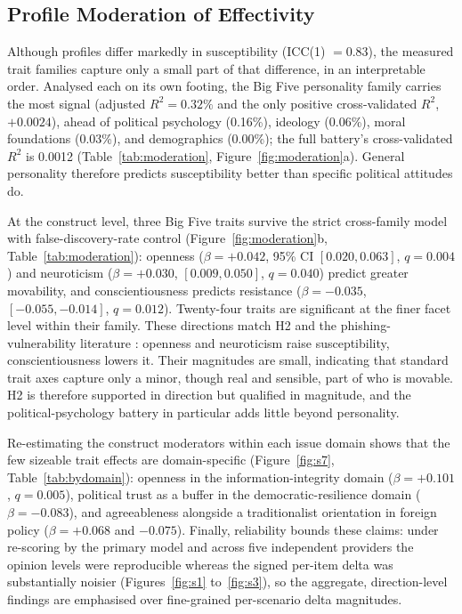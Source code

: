 \documentclass[11pt,a4paper]{article}
\begin{document}
\subsection{Profile Moderation of Effectivity}\label{sec:moderation}

Although profiles differ markedly in susceptibility (ICC(1) $= 0.83$), the measured trait families
capture only a small part of that difference, in an interpretable order. Analysed each on its own
footing, the Big Five personality family carries the most signal (adjusted $R^2 = 0.32\%$ and the
only positive cross-validated $R^2$, $+0.0024$), ahead of political psychology (0.16\%), ideology
(0.06\%), moral foundations (0.03\%), and demographics (0.00\%); the full battery's cross-validated
$R^2$ is 0.0012 (Table~\ref{tab:moderation}, Figure~\ref{fig:moderation}a). General personality
therefore predicts susceptibility better than specific political attitudes do.

At the construct level, three Big Five traits survive the strict cross-family model with
false-discovery-rate control (Figure~\ref{fig:moderation}b, Table~\ref{tab:moderation}): openness
($\beta = +0.042$, 95\% CI $[0.020, 0.063]$, $q = 0.004$) and neuroticism ($\beta = +0.030$,
$[0.009, 0.050]$, $q = 0.040$) predict greater movability, and conscientiousness predicts resistance
($\beta = -0.035$, $[-0.055, -0.014]$, $q = 0.012$). Twenty-four traits are significant at the finer
facet level within their family. These directions match H2 and the phishing-vulnerability literature
\citep{lopezaguilar2025phishing,palmtims2025influence}: openness and neuroticism raise
susceptibility, conscientiousness lowers it. Their magnitudes are small, indicating that standard
trait axes capture only a minor, though real and sensible, part of who is movable. H2 is therefore
supported in direction but qualified in magnitude, and the political-psychology battery in particular
adds little beyond personality.

Re-estimating the construct moderators within each issue domain shows that the few sizeable trait
effects are domain-specific (Figure~\ref{fig:s7}, Table~\ref{tab:bydomain}): openness in the
information-integrity domain ($\beta = +0.101$, $q = 0.005$), political trust as a buffer in the
democratic-resilience domain ($\beta = -0.083$), and agreeableness alongside a traditionalist
orientation in foreign policy ($\beta = +0.068$ and $-0.075$). Finally, reliability bounds these
claims: under re-scoring by the primary model and across five independent providers the opinion
levels were reproducible whereas the signed per-item delta was substantially noisier
(Figures~\ref{fig:s1} to~\ref{fig:s3}), so the aggregate, direction-level findings are emphasised
over fine-grained per-scenario delta magnitudes.
\end{document}
